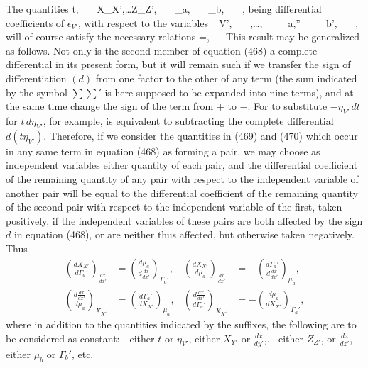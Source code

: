 \documentclass[12pt]{article}
\begin{document}
{The quantities
\eqs t, \ \ \ X_{X'},\dots Z_{Z'}, \ \ \ \mu_a, \ \ \ \mu_b, \ \ \ ,       \label{469} \eqe
being differential coefficients of $\epsilon_{V'}$, with respect to the variables
\eqs \eta_{V'}, \ \ \ ,\dots {}, \ \ \ \Gamma_a,'' \ \ \ \Gamma_b', \ \ \ , \label{470} \eqe
will of course satisfy the necessary relations
\eqs {}=, \ \          \label{471} \eqe
This result may be generalized as follows. Not only is the second member of equation (468) a complete differential in its present form, but it will remain such if we transfer the sign of differentiation $(d)$ from one factor to the other of any term (the sum indicated by the
symbol $\sum\sum\nolimits'$ is here supposed to be expanded into nine terms), and at the same time change the sign of the term from $+$ to $-$. For to substitute $-\eta_{V'} \,dt$ for $t\,d\eta_{V'}$, for example, is equivalent to subtracting the complete differential $d(t\eta_{V'})$. Therefore, if we consider the quantities in (469) and (470) which occur in any same term in equation (468) as forming a pair, we may choose as independent variables either quantity of each pair, and the differential coefficient of the remaining quantity of any pair with respect to the independent variable of another pair will be equal to the differential coefficient of the remaining quantity of the second pair with respect to the independent variable of the first, taken positively, if the independent variables of these pairs are both affected by the sign $d$ in equation (468), or are neither thus affected, but otherwise taken negatively. Thus
\begin{align}
\left( \frac{dX_{X'}}{d\Gamma_a'}\right)_{\frac{dx}{dx'}} &=   \left(\frac{d\mu_a}{d\frac{dx}{dx'}} \right)_{\Gamma_a'},     &    
\left( \frac{dX_{X'}}{d\mu_a}\right)_{\frac{dx}{dx'}} &=  - \left(\frac{d\Gamma_a'}{d\frac{dx}{dx'}} \right)_{\mu_a},    \label{472} \\
\left( \frac{d\frac{dx}{dx'}}{d\mu_a}\right)_{X_{X'}} &=   \left(\frac{d\Gamma_a'}{d X_{X'}} \right)_{\mu_a},     &    
\left( \frac{d\frac{dx}{dx'}}{d\Gamma_a'}\right)_{X_{X'}} &=  -\left(\frac{d\mu_a}{d X_{X'}} \right)_{\Gamma_a'},   \label{473} 
\end{align}
where in addition to the quantities indicated by the suffixes, the following are to be considered as constant:---either $t$ or $\eta_{V'}$, either $X_{Y'}$ or $\frac{dx}{dy'}$,... either $Z_{Z'}$, or $\frac{dz}{dz'}$, either $\mu_b$ or $\Gamma_b'$, etc.


}
\end{document}
